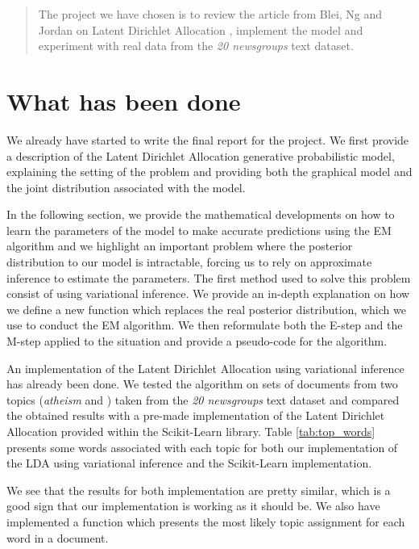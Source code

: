 \documentclass{article}
\begin{document}
\begin{abstract} 
The project we have chosen is to review the article from Blei, Ng and Jordan on Latent Dirichlet Allocation \cite{blei2003latent}, implement the model and experiment with real data from the \textit{20 newsgroups} text dataset.
\end{abstract} 


\section{What has been done}

We already have started to write the final report for the project. We first provide a description of the Latent Dirichlet Allocation generative probabilistic model, explaining the setting of the problem and providing both the graphical model and the joint distribution associated with the model.

In the following section, we provide the mathematical developments on how to learn the parameters of the model to make accurate predictions using the EM algorithm and we highlight an important problem where the posterior distribution to our model is intractable, forcing us to rely on approximate inference to estimate the parameters. The first method used to solve this problem consist of using variational inference. We provide an in-depth explanation on how we define a new function which replaces the real posterior distribution, which we use to conduct the EM algorithm. We then reformulate both the E-step and the M-step applied to the situation and provide a pseudo-code for the algorithm.

An implementation of the Latent Dirichlet Allocation using variational inference has already been done. We tested the algorithm on sets of documents from two topics (\textit{atheism} and \textit{
}) taken from the \textit{20 newsgroups} text dataset and compared the obtained results with a pre-made implementation of the Latent Dirichlet Allocation provided within the Scikit-Learn library. Table \ref{tab:top_words} presents some words associated with each topic for both our implementation of the LDA using variational inference and the Scikit-Learn implementation.

We see that the results for both implementation are pretty similar, which is a good sign that our implementation is working as it should be. We also have implemented a function which presents the most likely topic assignment for each word in a document.
\end{document}
